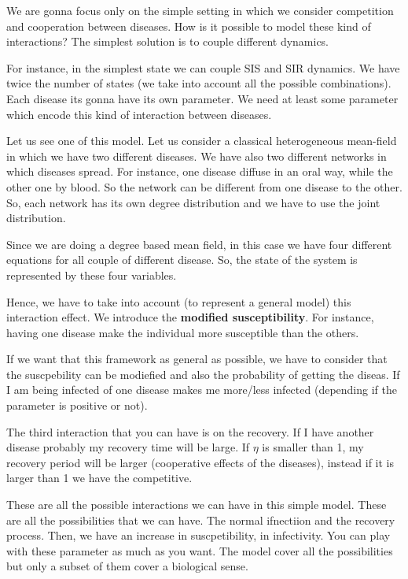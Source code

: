 \documentclass[../main/main.tex]{subfiles}
\begin{document}
We are gonna focus only on the simple setting in which we consider competition and cooperation between diseases. How is it possible to model these kind of interactions?
The simplest solution is to couple different dynamics.

For instance, in the simplest state we can couple SIS and SIR dynamics.
We have twice the number of states (we take into account all the possible combinations). Each disease its gonna have its own parameter.
We need at least some parameter which encode this kind of interaction between diseases.

Let us see one of this model. Let us consider a classical heterogeneous mean-field in which we have two different diseases.
We have also two different networks in which diseases spread.
For instance, one disease diffuse in an oral way, while the other one by blood. So the network can be different from one disease to the other. So, each network has its own degree distribution and we have to use the joint distribution.

Since we are doing a degree based mean field, in this case we have four different equations for all couple of different disease. So, the state of the system is represented by these four variables.

Hence, we have to take into account (to represent a general model) this interaction effect. We introduce the \textbf{modified susceptibility}. For instance, having one disease make the individual more susceptible than the others.

If we want that this framework as general as possible, we have to consider that the suscpebility can be modiefied and also the probability of getting the diseas. If I am being infected of one disease makes me more/less infected (depending if the parameter is positive or not).

The third interaction that you can have is on the recovery. If I have another disease probably my recovery time will be large. If \( \eta  \) is smaller than 1, my recovery period will be larger (cooperative effects of the diseases), instead if it is larger than 1 we have the competitive.

These are all the possible interactions we can have in this simple model. These are all the possibilities that we can have. The normal ifnectiion and the recovery process. Then, we have an increase in suscpetibility, in infectivity. You can play with these parameter as much as you want.
The model cover all the possibilities but only a subset of them cover a biological sense.
\end{document}

